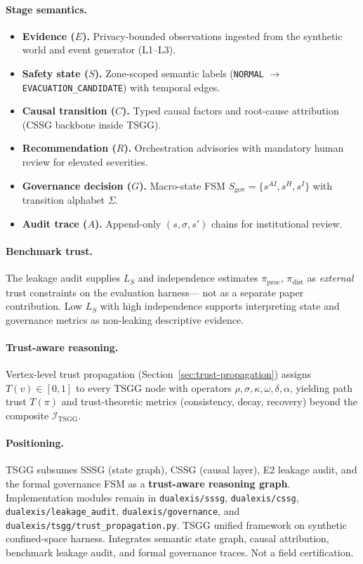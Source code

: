 \paragraph{Stage semantics.}
\begin{itemize}[noitemsep]
  \item \textbf{Evidence ($E$).} Privacy-bounded observations ingested from the synthetic
        world and event generator (L1--L3).
  \item \textbf{Safety state ($S$).} Zone-scoped semantic labels
        (\texttt{NORMAL} $\rightarrow$ \texttt{EVACUATION\_CANDIDATE}) with temporal edges.
  \item \textbf{Causal transition ($C$).} Typed causal factors and root-cause attribution
        (CSSG backbone inside TSGG).
  \item \textbf{Recommendation ($R$).} Orchestration advisories with mandatory human review
        for elevated severities.
  \item \textbf{Governance decision ($G$).} Macro-state FSM
        $S_{\mathrm{gov}}=\{s^{AI}, s^{H}, s^{I}\}$ with transition alphabet
        $\Sigma$.
  \item \textbf{Audit trace ($A$).} Append-only $(s,\sigma,s')$ chains for institutional review.
\end{itemize}

\paragraph{Benchmark trust.}
The leakage audit supplies $L_S$ and independence estimates $\pi_{\mathrm{proc}}$,
$\pi_{\mathrm{dist}}$ as \emph{external} trust constraints on the evaluation harness---
not as a separate paper contribution. Low $L_S$ with high independence supports interpreting
state and governance metrics as non-leaking descriptive evidence.

\paragraph{Trust-aware reasoning.}
Vertex-level trust propagation (Section~\ref{sec:trust-propagation}) assigns
$T(v)\in[0,1]$ to every TSGG node with operators
$\rho,\sigma,\kappa,\omega,\delta,\alpha$, yielding path trust $T(\pi)$ and
trust-theoretic metrics (consistency, decay, recovery) beyond the composite
$\mathcal{I}_{\mathrm{TSGG}}$.

\paragraph{Positioning.}
TSGG subsumes SSSG (state graph), CSSG (causal layer), E2 leakage audit, and the formal
governance FSM as a \textbf{trust-aware reasoning graph}. Implementation modules remain in
\texttt{dualexis/sssg}, \texttt{dualexis/cssg}, \texttt{dualexis/leakage\_audit},
\texttt{dualexis/governance}, and \texttt{dualexis/tsgg/trust\_propagation.py}.
TSGG unified framework on synthetic confined-space harness. Integrates semantic state graph, causal attribution, benchmark leakage audit, and formal governance traces. Not a field certification.
